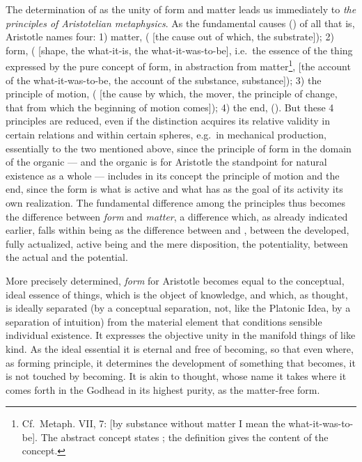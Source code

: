 The determination of  as the unity of form and matter leads
us immediately to \emph{the prin\setcounter{footnote}{0}ciples of Aristotelian metaphysics}. As the fundamental causes () of all that is,
Aristotle names four: 1) matter, \emph{} ( [the cause out of which, the substrate]);
2) form, \emph{} ( [shape, the what-it-is, the what-it-was-to-be], i.e.\ the essence of the thing
expressed by the pure concept of form, in abstraction from
matter\footnote{Cf.\ Metaph. VII, 7:  [by substance without matter I mean the what-it-was-to-be]. The abstract concept states ; the definition gives the content of the concept.},  [the account of the what-it-was-to-be, the account of the substance, substance]);
3) the principle of motion, \emph{} (
 [the cause by which, the mover, the principle of change, that from which the beginning of motion comes]);
4) the end, \emph{} (). But these 4 principles
are reduced, even if the distinction acquires its relative validity in
certain relations and within certain spheres, e.g.\ in mechanical production, essentially to the two mentioned above, since
the principle of form in the domain of the organic --- and the organic
is for Aristotle the standpoint for natural existence as a whole --- includes in its concept the principle of motion and the end, since the form is what is active and what has as the goal of
its activity its own realization. The fundamental difference
among the principles thus becomes the difference between \emph{form} and
\emph{matter}, a difference which, as already indicated earlier, falls
within being as the difference between  and
, between the developed, fully actualized, active being and the mere disposition, the potentiality, between the
actual and the potential.

More precisely determined, \emph{form} for Aristotle becomes equal to
the conceptual, ideal essence of things, which is the object of knowledge, and which, as thought, is ideally separated (by a conceptual separation,
not, like the Platonic Idea, by a separation of intuition) from
the material element that conditions sensible individual existence.
It expresses the objective unity in the manifold things of like
kind. As the ideal essential it is eternal and free of becoming, so that even where, as forming principle, it determines the development of something that becomes, it is not touched by becoming. It is
akin to thought, whose name it takes where it comes forth in the Godhead in its highest purity, as the matter-free form.

